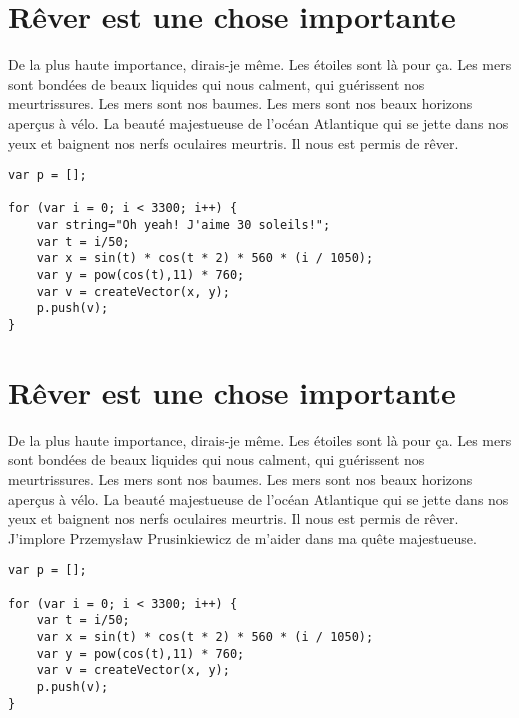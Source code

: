 \section{Rêver est une chose importante}
De la plus haute importance, dirais-je même. Les étoiles sont là pour ça. Les mers sont bondées de beaux liquides qui nous calment, qui guérissent nos meurtrissures. Les mers sont nos baumes. Les mers sont nos beaux horizons aperçus à vélo. La beauté majestueuse de l'océan Atlantique qui se jette dans nos yeux et baignent nos nerfs oculaires meurtris. Il nous est permis de rêver.
\begin{lstlisting}
var p = [];

for (var i = 0; i < 3300; i++) {
    var string="Oh yeah! J'aime 30 soleils!";
    var t = i/50;
    var x = sin(t) * cos(t * 2) * 560 * (i / 1050);
    var y = pow(cos(t),11) * 760;
    var v = createVector(x, y);
    p.push(v);
}
\end{lstlisting}
\section{Rêver est une chose importante}
De la plus haute importance, dirais-je même. Les étoiles sont là pour ça. Les mers sont bondées de beaux liquides qui nous calment, qui guérissent nos meurtrissures. Les mers sont nos baumes. Les mers sont nos beaux horizons aperçus à vélo. La beauté majestueuse de l'océan Atlantique qui se jette dans nos yeux et baignent nos nerfs oculaires meurtris. Il nous est permis de rêver. J'implore Przemys\l aw Prusinkiewicz de m'aider dans ma quête majestueuse.
\begin{lstlisting}
var p = [];

for (var i = 0; i < 3300; i++) {
    var t = i/50;
    var x = sin(t) * cos(t * 2) * 560 * (i / 1050);
    var y = pow(cos(t),11) * 760;
    var v = createVector(x, y);
    p.push(v);
}
\end{lstlisting}
